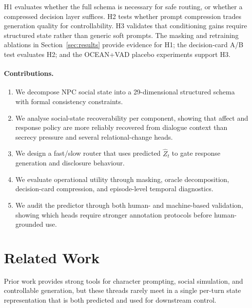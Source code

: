 \documentclass[11pt]{article}
\begin{document}
\noindent H1 evaluates whether the full schema is necessary for safe routing, or whether a compressed decision layer suffices. H2 tests whether prompt compression trades generation quality for controllability. H3 validates that conditioning gains require structured state rather than generic soft prompts. The masking and retraining ablations in Section~\ref{sec:results} provide evidence for H1; the decision-card A/B test evaluates H2; and the OCEAN+VAD placebo experiments support H3.

\paragraph{Contributions.}
\begin{enumerate} \setlength\itemsep{0em}
    \item We decompose NPC social state into a 29-dimensional structured schema with formal consistency constraints.
    \item We analyse social-state recoverability per component, showing that affect and response policy are more reliably recovered from dialogue context than secrecy pressure and several relational-change heads.
    \item We design a fast/slow router that uses predicted $\hat{Z}_t$ to gate response generation and disclosure behaviour.
    \item We evaluate operational utility through masking, oracle decomposition, decision-card compression, and episode-level temporal diagnostics.
    \item We audit the predictor through both human- and machine-based validation, showing which heads require stronger annotation protocols before human-grounded use.
\end{enumerate}

\section{Related Work}
\label{sec:related}

Prior work provides strong tools for character prompting, social simulation, and controllable generation, but these threads rarely meet in a single per-turn state representation that is both predicted and used for downstream control.
\end{document}
